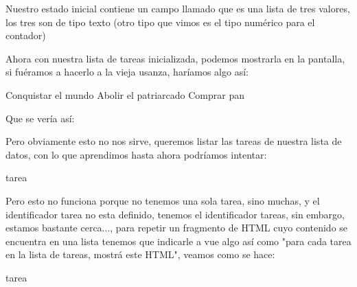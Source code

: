 \documentclass[letterpaper,10pt,spanish]{sphinxmanual}
\begin{document}
Nuestro estado inicial contiene un campo llamado  que es una lista de
tres valores, los tres son de tipo texto (otro tipo que vimos es el tipo
numérico para el contador)

Ahora con nuestra lista de tareas inicializada, podemos mostrarla en la pantalla,
si fuéramos a hacerlo a la vieja usanza, haríamos algo así:

%
\begin{sphinxVerbatim}[commandchars=\\\{\}]
    Conquistar el mundo
    Abolir el patriarcado
    Comprar pan
\end{sphinxVerbatim}

Que se vería así:



Pero obviamente esto no nos sirve, queremos listar las tareas de nuestra lista
de datos, con lo que aprendimos hasta ahora podríamos intentar:

%
\begin{sphinxVerbatim}[commandchars=\\\{\}]
    \PYGZob{}\PYGZob{}tarea\PYGZcb{}\PYGZcb{}
\end{sphinxVerbatim}

Pero esto no funciona porque no tenemos una sola tarea, sino muchas, y el
identificador tarea no esta definido, tenemos el identificador tareas, sin embargo, estamos bastante cerca..., para repetir un fragmento de HTML cuyo contenido
se encuentra en una lista tenemos que indicarle a vue algo así como "para cada tarea en la lista de tareas, mostrá este HTML", veamos como se hace:

%
\begin{sphinxVerbatim}[commandchars=\\\{\}]
 
         \PYGZob{}\PYGZob{}tarea\PYGZcb{}\PYGZcb{}
\end{sphinxVerbatim}
\end{document}
